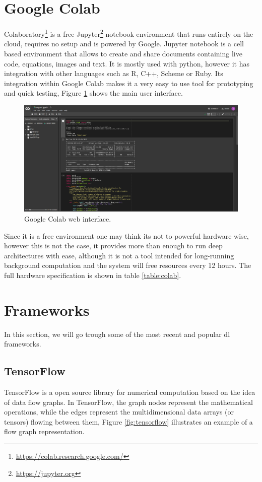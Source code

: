 \section{Google Colab}
Colaboratory\footnote{\url{https://colab.research.google.com/}} is a free Jupyter\footnote{\url{https://jupyter.org}} notebook environment that runs entirely on the cloud, requires no setup and is powered by Google. Jupyter notebook is a cell based environment that allows to create and share documents containing live code\texttt{}, equations, images and text. It is mostly used with python, however it has integration with other languages such as R, C++, Scheme or Ruby. Its integration within Google Colab makes it a very easy to use tool for prototyping and quick testing, Figure \ref{fig:colab} shows the main user interface.

\begin{figure}
	\centering
	\includegraphics[width=0.8\linewidth]{archivos/colab}
	\caption{Google Colab web interface.}
	\label{fig:colab}
\end{figure}

Since it is a free environment one may think its not to powerful hardware wise, however this is not the case, it provides more than enough to run deep architectures with ease, although it is not a tool intended for long-running background computation and the system will free resources every 12 hours.
The full hardware specification is shown in table \ref{table:colab}.
\section{Frameworks}
In this section, we will go trough some of the most recent and popular \gls{dl} frameworks.

\subsection{TensorFlow}
TensorFlow is a open source library for numerical computation based on the idea of data flow graphs. In TensorFlow, the graph nodes represent the mathematical operations, while the edges represent the multidimensional data arrays (or tensors) flowing between them, Figure \ref{fig:tensorflow} illustrates an example of a flow graph representation.

